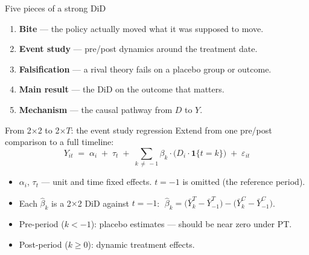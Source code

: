 \documentclass[aspectratio=169,11pt]{beamer}
\begin{document}

\begin{frame}{Five pieces of a strong DiD}
\vspace{0.5em}
\begin{enumerate}\setlength\itemsep{0.7em}
  \item \textbf{Bite} --- the policy actually moved what it was supposed to move.
  \item \textbf{Event study} --- pre/post dynamics around the treatment date.
  \item \textbf{Falsification} --- a rival theory fails on a placebo group or outcome.
  \item \textbf{Main result} --- the DiD on the outcome that matters.
  \item \textbf{Mechanism} --- the causal pathway from $D$ to $Y$.
\end{enumerate}
\vspace{0.5em}
\end{frame}

\begin{frame}{From 2$\times$2 to 2$\times T$: the event study regression}
\vspace{0.3em}
Extend from one pre/post comparison to a full timeline:
\[
Y_{it} \;=\; \alpha_i \;+\; \tau_t \;+\; \sum_{k \,\neq\, -1} \beta_k \cdot \bigl(D_i \cdot \mathbf{1}\{t = k\}\bigr) \;+\; \varepsilon_{it}
\]
\vspace{0.1em}
\begin{itemize}\setlength\itemsep{3pt}
  \item $\alpha_i$, $\tau_t$ --- unit and time fixed effects. \;$t = -1$ is omitted (the reference period).
  \item Each $\hat\beta_k$ is a 2$\times$2 DiD against $t=-1$:
  $\;\hat\beta_k = \bigl(\bar Y^T_k - \bar Y^T_{-1}\bigr) - \bigl(\bar Y^C_k - \bar Y^C_{-1}\bigr)$.
  \item Pre-period ($k < -1$): placebo estimates --- should be near zero under PT.
  \item Post-period ($k \geq 0$): dynamic treatment effects.
\end{itemize}
\end{frame}
\end{document}
